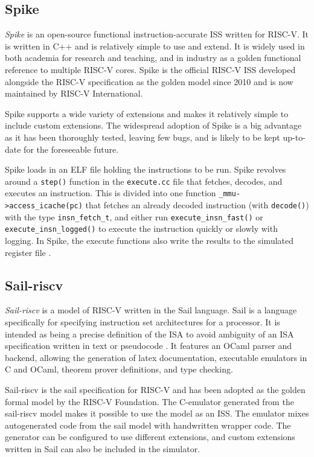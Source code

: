 \subsection{Spike}
\label{sec:spike}

\textit{Spike} is an open-source functional instruction-accurate ISS written for RISC-V. It is written in C++ and is relatively simple to use and extend. It is widely used in both academia for research and teaching, and in industry as a golden functional reference to multiple RISC-V cores. Spike is the official RISC-V ISS developed alongside the RISC-V specification as the golden model since 2010 and is now maintained by RISC-V International. \cite{SpikeRISCVISA2023}

Spike supports a wide variety of extensions and makes it relatively simple to include custom extensions.
The widespread adoption of Spike is a big advantage as it has been thoroughly tested, leaving few bugs, and is likely to be kept up-to-date for the foreseeable future. 

Spike loads in an ELF file holding the instructions to be run.
Spike revolves around a \lstinline{step()} function in the \lstinline{execute.cc} file that fetches, decodes, and executes an instruction. This is divided into one function \lstinline{_mmu->access_icache(pc)} that fetches an already decoded instruction (with \lstinline{decode()}) with the type \lstinline{insn_fetch_t}, and either run \lstinline{execute_insn_fast()} or \lstinline{execute_insn_logged()} to execute the instruction quickly or slowly with logging. In Spike, the execute functions also write the results to the simulated register file \cite{SpikeRISCVISA2023}.

\subsection{Sail-riscv}
\label{sec:sail}

\textit{Sail-riscv} is a model of RISC-V written in the Sail language. Sail is a language specifically for specifying instruction set architectures for a processor. It is intended as being a precise definition of the ISA to avoid ambiguity of an ISA specification written in text or pseudocode \cite{armstrongSailInstructionsetSemantics2023}. It features an OCaml parser and backend, allowing the generation of latex documentation, executable emulators in C and OCaml, theorem prover definitions, and type checking. 

Sail-riscv is the sail specification for RISC-V and has been adopted as the golden formal model by the RISC-V Foundation\cite{RISCVSailModel2023}. 
The C-emulator generated from the sail-riscv model makes it possible to use the model as an ISS. The emulator mixes autogenerated code from the sail model with handwritten wrapper code. The generator can be configured to use different extensions, and custom extensions written in Sail can also be included in the simulator. 

